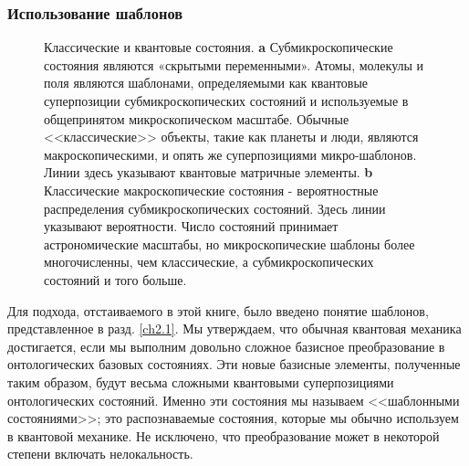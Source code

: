 \documentclass[main.tex]{subfiles}
\begin{document}
\subsubsection{Использование шаблонов}\label{ch4.3.1}

\begin{figure}[ht] %
	\begin{center}
		\caption{
		\label{i4.1}
		Классические и квантовые состояния. \textbf{a} Субмикроскопические состояния являются «скрытыми переменными». Атомы, молекулы и поля являются шаблонами, определяемыми как квантовые суперпозиции субмикроскопических состояний и используемые в общепринятом микроскопическом масштабе. Обычные <<классические>> объекты, такие как планеты и люди, являются макроскопическими, и опять же суперпозициями микро-шаблонов. Линии здесь указывают квантовые матричные элементы.  \textbf{b} Классические макроскопические состояния - вероятностные распределения субмикроскопических состояний. Здесь линии указывают вероятности. Число состояний принимает астрономические масштабы, но микроскопические шаблоны более многочисленны, чем классические, а субмикроскопических состояний и того больше.}
	\end {center}
\end {figure}

Для подхода, отстаиваемого в этой книге, было введено понятие шаблонов, представленное в разд. \ref{ch2.1}. Мы утверждаем, что обычная квантовая механика достигается, если мы выполним довольно сложное базисное преобразование в онтологических базовых состояниях. Эти новые базисные элементы, полученные таким образом, будут весьма сложными квантовыми суперпозициями онтологических состояний. Именно эти состояния мы называем <<шаблонными состояниями>>; это распознаваемые состояния, которые мы обычно используем в квантовой механике. Не исключено, что преобразование может в некоторой степени включать нелокальность.
\end{document}
